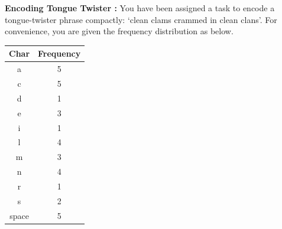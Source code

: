 \documentclass[solution,addpoints,12pt]{exam}
\begin{document}
\begin{questions}
\question \textbf{Encoding Tongue Twister :} You have been assigned a task to encode a tongue-twister
phrase compactly:
`clean clams crammed in clean clans'.
For convenience, you are given the frequency distribution as below.
\begin{table}[h]
    \centering
    \begin{tabular}{c|c}
        \toprule
         Char & Frequency  \\
         \midrule
         a & 5\\
         c & 5 \\
         d & 1 \\
         e & 3 \\
         i & 1 \\
         l & 4 \\
         m & 3 \\
         n & 4 \\
         r & 1 \\
         s & 2 \\
         space & 5\\
         \bottomrule
    \end{tabular}
    \label{tab1}
\end{table}
\begin{parts}

\end{parts}
\end{questions}
\end{document}
